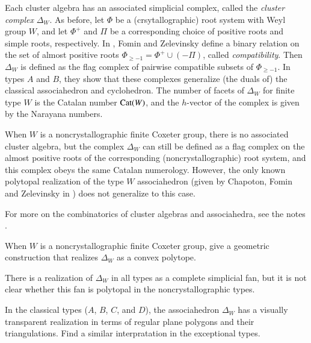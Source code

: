 \documentclass[12pt,letterpaper, reqno]{aimpl}
\newcommand{\Cat}{{\rm Cat}}
\begin{document}
Each cluster algebra has an associated simplicial complex, called the \emph{cluster complex} $\Delta_W$. As before, let $\Phi$ be a (crsytallographic) root system with Weyl group $W$, and let $\Phi^+$ and $\Pi$ be a corresponding choice of positive roots and simple roots, respectively. In \cite{fomin-zelevinsky:ysystems}, Fomin and Zelevinsky define a binary relation on the set of almost positive roots $\Phi_{\geq -1}= \Phi^+ \cup (-\Pi)$, called \emph{compatibility}. Then $\Delta_W$ is defined as the flag complex of pairwise compatible subsets of $\Phi_{\geq -1}$. In types $A$ and $B$, they show that these complexes generalize (the duals of) the classical associahedron and cyclohedron. The number of facets of $\Delta_W$ for finite type $W$ is the Catalan number $\Cat(W)$, and the $h$-vector of the complex is given by the Narayana numbers.

When $W$ is a noncrystallographic finite Coxeter group, there is no associated cluster algebra, but the complex $\Delta_W$ can still be defined as a flag complex on the almost positive roots of the corresponding (noncrystallographic) root system, and this complex obeys the same Catalan numerology. However, the only known polytopal realization of the type $W$ associahedron (given by Chapoton, Fomin and Zelevinsky in \cite{chapoton-fomin-zelevinsky}) does not generalize to this case.

For more on the combinatorics of cluster algebras and associahedra, see the notes \cite{fomin-reading:survey}.

\begin{problemblock}
\begin{problem}[6.1] \label{prob:polytopal} When $W$ is a noncrystallographic finite Coxeter group, give a geometric construction that realizes $\Delta_W$ as a convex polytope. \end{problem}There is a realization of $\Delta_W$ in all types as a complete simplicial fan, but it is not clear whether this fan is polytopal in the noncrystallographic types.

\end{problemblock}

\begin{prob}[6.2] 
In the classical types ($A$, $B$, $C$, and $D$), the associahedron $\Delta_W$ has a visually transparent realization in terms of regular plane polygons and their triangulations. Find a similar interpratation in the exceptional types.
\end{prob}
\end{document}
